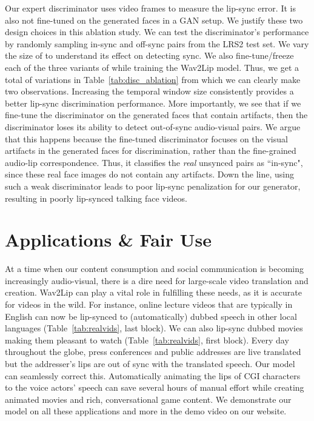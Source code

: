 \documentclass[sigconf]{acmart}
\begin{document}
Our expert discriminator uses  video frames to measure the lip-sync error. It is also not fine-tuned on the generated faces in a GAN setup. We justify these two design choices in this ablation study. We can test the discriminator's performance by randomly sampling in-sync and off-sync pairs from the LRS2 test set. We vary the size of  to understand its effect on detecting sync. We also fine-tune/freeze each of the three variants of  while training the Wav2Lip model. Thus, we get a total of  variations in Table~\ref{tab:disc_ablation} from which we can clearly make two observations. Increasing the temporal window size  consistently provides a better lip-sync discrimination performance. More importantly, we see that if we fine-tune the discriminator on the generated faces that contain artifacts, then the discriminator loses its ability to detect out-of-sync audio-visual pairs. We argue that this happens because the fine-tuned discriminator focuses on the visual artifacts in the generated faces for discrimination, rather than the fine-grained audio-lip correspondence. Thus, it classifies the \textit{real} unsynced pairs as ``in-sync", since these real face images do not contain any artifacts. Down the line, using such a weak discriminator leads to poor lip-sync penalization for our generator, resulting in poorly lip-synced talking face videos.

\section{Applications \& Fair Use}
\label{sec:apps}
At a time when our content consumption and social communication is becoming increasingly audio-visual, there is a dire need for large-scale video translation and creation. Wav2Lip can play a vital role in fulfilling these needs, as it is accurate for videos in the wild. For instance, online lecture videos that are typically in English can now be lip-synced to (automatically) dubbed speech in other local languages (Table~\ref{tab:realvids}, last block). We can also lip-sync dubbed movies making them pleasant to watch (Table~\ref{tab:realvids}, first block). Every day throughout the globe, press conferences and public addresses are live translated but the addresser's lips are out of sync with the translated speech. Our model can seamlessly correct this. Automatically animating the lips of CGI characters to the voice actors' speech can save several hours of manual effort while creating animated movies and rich, conversational game content. We demonstrate our model on all these applications and more in the demo video on our website. 
\end{document}

